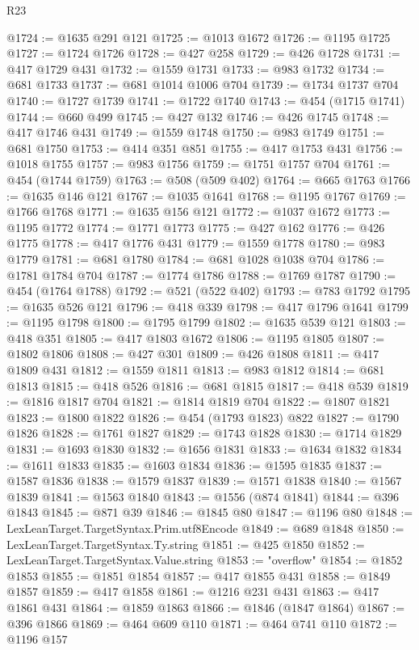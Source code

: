 \begin{lexlean}{R23}
\begin{coremodule}
{{{{{{{{{{{{{{{{{{{{{{{{{{{{{{{{{{{{{{{{{{{{{{{{{{{{{{{{{{{{{{{{{{{{{{{{{{{{{{{{{{{{{{{{{{{{{@1724 := @1635 @291 @121
@1725 := @1013 @1672
@1726 := @1195 @1725
@1727 := @1724 @1726
@1728 := @427 @258
@1729 := @426 @1728
@1731 := @417 @1729 @431
@1732 := @1559 @1731
@1733 := @983 @1732
@1734 := @681 @1733
@1737 := @681 @1014 @1006 @704
@1739 := @1734 @1737 @704
@1740 := @1727 @1739
@1741 := @1722 @1740
@1743 := @454 (@1715 @1741)
@1744 := @660 @499
@1745 := @427 @132
@1746 := @426 @1745
@1748 := @417 @1746 @431
@1749 := @1559 @1748
@1750 := @983 @1749
@1751 := @681 @1750
@1753 := @414 @351 @851
@1755 := @417 @1753 @431
@1756 := @1018 @1755
@1757 := @983 @1756
@1759 := @1751 @1757 @704
@1761 := @454 (@1744 @1759)
@1763 := @508 (@509 @402)
@1764 := @665 @1763
@1766 := @1635 @146 @121
@1767 := @1035 @1641
@1768 := @1195 @1767
@1769 := @1766 @1768
@1771 := @1635 @156 @121
@1772 := @1037 @1672
@1773 := @1195 @1772
@1774 := @1771 @1773
@1775 := @427 @162
@1776 := @426 @1775
@1778 := @417 @1776 @431
@1779 := @1559 @1778
@1780 := @983 @1779
@1781 := @681 @1780
@1784 := @681 @1028 @1038 @704
@1786 := @1781 @1784 @704
@1787 := @1774 @1786
@1788 := @1769 @1787
@1790 := @454 (@1764 @1788)
@1792 := @521 (@522 @402)
@1793 := @783 @1792
@1795 := @1635 @526 @121
@1796 := @418 @339
@1798 := @417 @1796 @1641
@1799 := @1195 @1798
@1800 := @1795 @1799
@1802 := @1635 @539 @121
@1803 := @418 @351
@1805 := @417 @1803 @1672
@1806 := @1195 @1805
@1807 := @1802 @1806
@1808 := @427 @301
@1809 := @426 @1808
@1811 := @417 @1809 @431
@1812 := @1559 @1811
@1813 := @983 @1812
@1814 := @681 @1813
@1815 := @418 @526
@1816 := @681 @1815
@1817 := @418 @539
@1819 := @1816 @1817 @704
@1821 := @1814 @1819 @704
@1822 := @1807 @1821
@1823 := @1800 @1822
@1826 := @454 (@1793 @1823) @822
@1827 := @1790 @1826
@1828 := @1761 @1827
@1829 := @1743 @1828
@1830 := @1714 @1829
@1831 := @1693 @1830
@1832 := @1656 @1831
@1833 := @1634 @1832
@1834 := @1611 @1833
@1835 := @1603 @1834
@1836 := @1595 @1835
@1837 := @1587 @1836
@1838 := @1579 @1837
@1839 := @1571 @1838
@1840 := @1567 @1839
@1841 := @1563 @1840
@1843 := @1556 (@874 @1841)
@1844 := @396 @1843
@1845 := @871 @39
@1846 := @1845 @80
@1847 := @1196 @80
@1848 := LexLeanTarget.TargetSyntax.Prim.utf8Encode
@1849 := @689 @1848
@1850 := LexLeanTarget.TargetSyntax.Ty.string
@1851 := @425 @1850
@1852 := LexLeanTarget.TargetSyntax.Value.string
@1853 := "overflow"
@1854 := @1852 @1853
@1855 := @1851 @1854
@1857 := @417 @1855 @431
@1858 := @1849 @1857
@1859 := @417 @1858
@1861 := @1216 @231 @431
@1863 := @417 @1861 @431
@1864 := @1859 @1863
@1866 := @1846 (@1847 @1864)
@1867 := @396 @1866
@1869 := @464 @609 @110
@1871 := @464 @741 @110
@1872 := @1196 @157
}}}}}}}}}}}}}}}}}}}}}}}}}}}}}}}}}}}}}}}}}}}}}}}}}}}}}}}}}}}}}}}}}}}}}}}}}}}}}}}}}}}}}}}}}}}}}
\end{coremodule}
\end{lexlean}
